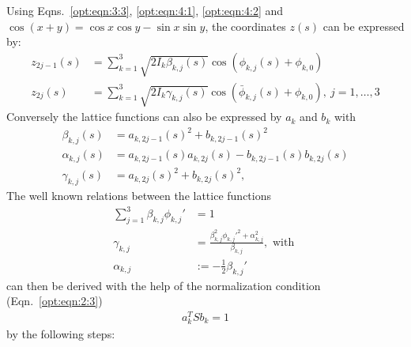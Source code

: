 \documentclass[english]{article}
\begin{document}
Using Eqns.~\ref{opt:eqn:3:3}, \ref{opt:eqn:4:1}, \ref{opt:eqn:4:2} and $\cos(x+y)=\cos x\cos y-\sin x\sin y$, the coordinates $z(s)$ can be expressed by:
\begin{align}
z_{2j-1}(s)&=\sum_{k=1}^3 \sqrt{2I_k
\beta_{k,j}(s)}\cos{(\phi_{k,j}(s)+\phi_{k,0})}\\
z_{2j}(s)&=\sum_{k=1}^3 \sqrt{2I_k
\gamma_{k,j}(s)}\cos{(\bar\phi_{k,j}(s)+\phi_{k,0})}, \ j=1,\ldots,3
\end{align}
Conversely the lattice functions can also be expressed by $a_k$ and $b_k$ with
\begin{align}
\beta_{k,j}(s)&=a_{k,2j-1}(s)^2 +b_{k,2j-1}(s)^2 \\
\alpha_{k,j}(s)&=a_{k,2j-1}(s)a_{k,2j}(s) -b_{k,2j-1}(s)b_{k,2j}(s) \\
\gamma_{k,j}(s)&=a_{k,2j}(s)^2 +b_{k,2j}(s)^2,
\end{align}
The well known relations between the lattice functions
\begin{align}
\sum_{j=1}^3\beta_{k,j}\phi_{k,j}'&=1 \\
\gamma_{k,j}&=\frac{\beta_{k,j}^2\phi_{k,j}'^2+\alpha_{k,j}^2}{\beta_{k,j}}, \text{ with  }\\
\alpha_{k,j}&:=-\frac{1}{2}\beta_{k,j}'
\end{align}
can then be derived with the help of the normalization condition (Eqn.~\ref{opt:eqn:2:3})
\begin{align}
a_k^TSb_k=1
\end{align}
by the following steps:
\end{document}

